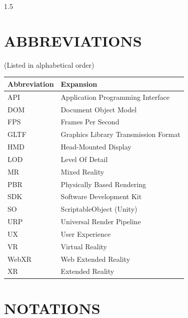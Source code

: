 \begin{spacing}{1.5}
\tableofcontents
{}
\listoftables
{}
\listoffigures

\chapter*{ABBREVIATIONS}

\begin{center}
(Listed in alphabetical order)
\begin{tabular}{p{}|p{}}
\hline
Abbreviation & Expansion \\
\hline
API   & Application Programming Interface \\
DOM   & Document Object Model \\
FPS   & Frames Per Second \\
GLTF  & Graphics Library Transmission Format \\
HMD   & Head-Mounted Display \\
LOD   & Level Of Detail \\
MR    & Mixed Reality \\
PBR   & Physically Based Rendering \\
SDK   & Software Development Kit \\
SO    & ScriptableObject (Unity) \\
URP   & Universal Render Pipeline \\
UX    & User Experience \\
VR    & Virtual Reality \\
WebXR & Web Extended Reality \\
XR    & Extended Reality \\
\hline
\end{tabular}
\end{center}

\chapter*{NOTATIONS}


\end{spacing}
